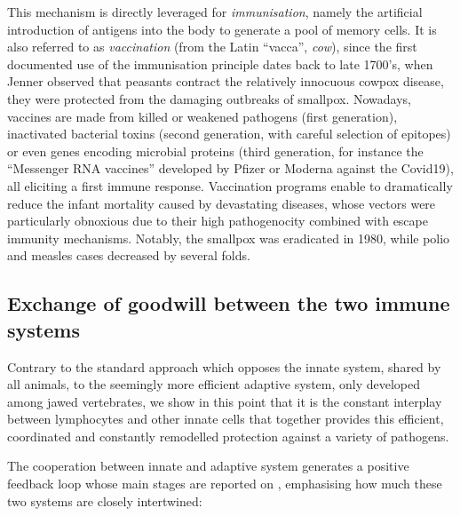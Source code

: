 \begin{enumerate}[label=(\alph*)]
This mechanism is directly leveraged for \emph{immunisation}, namely the artificial introduction of antigens into the body to generate a pool of memory cells. It is also referred to as \emph{vaccination} (from the Latin \enquote{vacca}, \emph{cow}), since the first documented use of the immunisation principle dates back to late 1700's, when Jenner observed that peasants contract the relatively innocuous cowpox disease, they were protected from the damaging outbreaks of smallpox. Nowadays, vaccines are made from killed or weakened pathogens (first generation), inactivated bacterial toxins (second generation, with careful selection of epitopes) or
even genes encoding microbial proteins (third generation, for instance the \enquote{Messenger RNA vaccines} developed by Pfizer or Moderna against the Covid19), all eliciting a first immune response. Vaccination programs enable to dramatically reduce the infant mortality caused by devastating diseases, whose vectors were particularly obnoxious due to their high pathogenocity combined with escape immunity mechanisms. Notably, the smallpox was eradicated in 1980, while polio and measles cases decreased by several folds.

\end{enumerate}


\subsection{Exchange of goodwill between the two immune systems}
\label{subsec:collab-innate-adaptive}

Contrary to the standard approach which opposes the innate system, shared by all animals, to the seemingly more efficient adaptive system, only developed among jawed vertebrates, we show in this point that it is the constant interplay between lymphocytes and other innate cells that together provides this efficient, coordinated and constantly remodelled protection against a variety of pathogens.

The cooperation between innate and adaptive system generates a positive feedback loop whose main stages are reported on , emphasising how much these two systems are closely intertwined:

